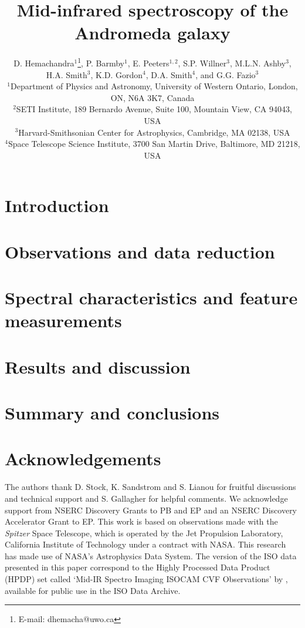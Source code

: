 \documentclass[useAMS,usenatbib,a4paper]{mn2e}
\title[Mid-infrared spectroscopy of M31]{Mid-infrared spectroscopy of the Andromeda galaxy}
\author[D. Hemachandra et al.]
{D. Hemachandra$^{1}$\thanks{E-mail: dhemacha@uwo.ca},
P. Barmby$^{1}$, 
E. Peeters$^{1,2}$, 
S.P. Willner$^{3}$, 
M.L.N. Ashby$^{3}$,
H.A. Smith$^{3}$, 
\newauthor 
K.D. Gordon$^{4}$,
D.A. Smith$^{4}$,
and
G.G. Fazio$^{3}$\\
$^{1}$Department of Physics and Astronomy, University of Western Ontario, London, ON, N6A 3K7, Canada\\
$^{2}$SETI Institute, 189 Bernardo Avenue, Suite 100, Mountain View, CA 94043, USA\\
$^{3}$Harvard-Smithsonian Center for Astrophysics, Cambridge, MA 02138, USA\\
$^{4}$Space Telescope Science Institute, 3700 San Martin Drive, Baltimore, MD 21218, USA
}
\begin{document}
\date{}

\maketitle

\label{firstpage}



\section{Introduction}



\section{Observations and data reduction}



\section{Spectral characteristics and feature measurements}
\label{sect:data_analysis}



\section{Results and discussion}





\section{Summary and conclusions}
\label{sect:summary}



\section*{Acknowledgements}

The authors thank D. Stock, K. Sandstrom and S. Lianou for fruitful discussions and technical support
and S. Gallagher for helpful comments.
We acknowledge support from NSERC Discovery Grants to PB and EP and an NSERC Discovery Accelerator Grant to EP. 
This work is based on observations made with the {\em Spitzer} Space Telescope, which is operated by the 
Jet Propulsion Laboratory, California Institute of Technology under a contract with NASA.
This research has made use of NASA's Astrophysics Data System.
The version of the ISO data presented in this paper correspond to the Highly Processed Data Product (HPDP) set called `Mid-IR Spectro Imaging ISOCAM CVF Observations'
by \citet{Boulanger_F_2005}, available for public use in the ISO Data Archive.



{}

\bsp

\label{lastpage}
\end{document}
